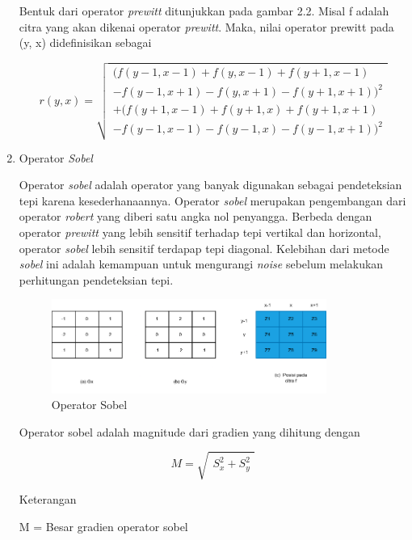 \begin{enumerate}[leftmargin=1cm, itemindent=0.6cm,labelwidth=15pt, labelsep=5pt, listparindent=1cm,align=left]
    Bentuk dari operator \textit{prewitt} ditunjukkan pada gambar 2.2. Misal f adalah citra yang akan dikenai operator \textit{prewitt}. Maka, nilai operator prewitt pada (y, x) didefinisikan sebagai

\begin{equation}
r(y,x) =
\sqrt{
\begin{aligned}
(f(y-1,x-1)+f(y,x-1)+f(y+1,x-1)\\
-f(y-1,x+1)-f(y,x+1)-f(y+1,x+1))^2\\
+(f(y+1,x-1)+f(y+1,x)+f(y+1,x+1)\\
-f(y-1,x-1)-f(y-1,x)-f(y-1,x+1))^2
\end{aligned}
}
\end{equation}

    \item Operator \textit{Sobel}

    Operator \textit{sobel} adalah operator yang banyak digunakan sebagai pendeteksian tepi karena kesederhanaannya. Operator \textit{sobel} merupakan pengembangan dari operator \textit{robert} yang diberi satu angka nol penyangga. Berbeda dengan operator \textit{prewitt} yang lebih sensitif terhadap tepi vertikal dan horizontal, operator \textit{sobel} lebih sensitif terdapap tepi diagonal. Kelebihan dari metode \textit{sobel} ini adalah kemampuan untuk mengurangi \textit{noise} sebelum melakukan perhitungan pendeteksian tepi.

\begin{figure}[ht]
    \includegraphics[width=0.85\textwidth, center]{images/Sobel.png}
    \caption{Operator Sobel}
\end{figure}

Operator sobel adalah magnitude dari gradien yang dihitung dengan

\begin{equation}
M =
\sqrt{
\begin{aligned}
S_x^2+S_y^2
\end{aligned}
}
\end{equation}

Keterangan

M = Besar gradien operator sobel


\end{enumerate}
